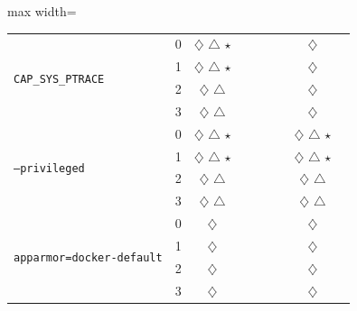 \documentclass[12pt]{report}
\begin{document}
\begin{doublespace}
\begin{table}[!h]
\begin{adjustbox}{max width=\textwidth}
\begin{tabular}{|l|c|c|c|c|c|c|c|c|}
        \multirow{4}{*}{\texttt{CAP\_SYS\_PTRACE}} 
            & 0 & $\diamondsuit$ $\triangle$ $\star$ &  &  &  &  & $\diamondsuit$ \\
            & 1 & $\diamondsuit$ $\triangle$ $\star$ &  &  &  &  & $\diamondsuit$ \\
            & 2 & $\diamondsuit$ $\triangle$ &  &  &  &  & $\diamondsuit$ \\
            & 3 & $\diamondsuit$ $\triangle$ &  &  &  &  & $\diamondsuit$ \\
        \hline

        \multirow{4}{*}{\texttt{--privileged}} 
            & 0 & $\diamondsuit$ $\triangle$ $\star$ &  &  &  &  & $\diamondsuit$ $\triangle$ $\star$ \\
            & 1 & $\diamondsuit$ $\triangle$ $\star$ &  &  &  &  & $\diamondsuit$ $\triangle$ $\star$ \\
            & 2 & $\diamondsuit$ $\triangle$ &  &  &  &  & $\diamondsuit$ $\triangle$ \\
            & 3 & $\diamondsuit$ $\triangle$ &  &  &  &  & $\diamondsuit$ $\triangle$ \\
        \hline

        \multirow{4}{*}{\texttt{apparmor=docker-default}} 
            & 0 & $\diamondsuit$ &  &  &  &  & $\diamondsuit$ \\
            & 1 & $\diamondsuit$ &  &  &  &  & $\diamondsuit$ \\
            & 2 & $\diamondsuit$ &  &  &  &  & $\diamondsuit$ \\
            & 3 & $\diamondsuit$ &  &  &  &  & $\diamondsuit$ \\
        \hline


\end{tabular}
\end{adjustbox}
\end{table}
\end{doublespace}
\end{document}
